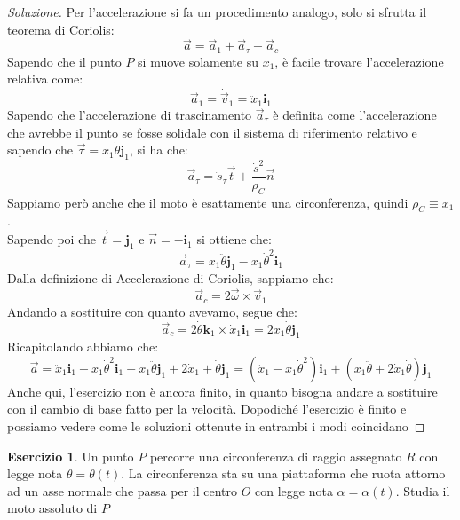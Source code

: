 \documentclass[11pt,a4paper,twoside]{article}
\theoremstyle{definition}
\newtheorem{ese}{Esercizio}[section]
\newenvironment{sol}
	{\renewcommand\qedsymbol{$\blacksquare$}\begin{proof}[Soluzione]}
	{\end{proof}}
\begin{document}
\begin{sol}
	Per l'accelerazione si fa un procedimento analogo, solo si sfrutta il teorema di Coriolis:
	\[\vec a = \vec a_1 + \vec a_\tau + \vec a_c\]
	Sapendo che il punto $P$ si muove solamente su $x_1$, è facile trovare l'accelerazione relativa come:
	\[ \vec a_1 = \dot{\vec v}_1 = \ddot x_1 \mathbf i_1 \]
	Sapendo che l'accelerazione di trascinamento $\vec a_\tau$ è definita come l'accelerazione che avrebbe il punto se fosse solidale con il sistema di riferimento relativo e sapendo che $\vec \tau = x_1 \dot \theta \mathbf j_1$, si ha che:
	\[ \vec a_\tau = \ddot s_\tau \vec t + \frac{\dot s^2}{\rho_C} \vec n \]
	Sappiamo però anche che il moto è esattamente una circonferenza, quindi $\rho_C\equiv x_1$.\\
	Sapendo poi che $ \vec t = \mathbf j_1$ e $\vec n = -\mathbf i_1$ si ottiene che:
	\[ \vec a_\tau = x_1 \ddot \theta \mathbf j_1 - x_1 \dot \theta^2 \mathbf i_1 \]
	Dalla definizione di Accelerazione di Coriolis, sappiamo che:
	\[ \vec a_c = 2 \vec \omega \times \vec v_1 \]
	Andando a sostituire con quanto avevamo, segue che:
	\[ \vec a_c = 2 \dot \theta \mathbf k_1 \times \dot x_1 \mathbf i_1 = 2 x_1 \dot \theta \mathbf j_1\]
	Ricapitolando abbiamo che:
	\[ \vec a = \ddot x_1 \mathbf i_1 - x_1 \dot \theta^2 \mathbf i_1 + x_1 \ddot \theta \mathbf j_1 + 2 \dot x_1 + \dot \theta \mathbf j_1 = (\ddot x_1 - x_1 \dot \theta^2)\mathbf i_1 + (x_1 \ddot \theta + 2 \dot x_1 \dot \theta) \mathbf j_1\]
	Anche qui, l'esercizio non è ancora finito, in quanto bisogna andare a sostituire con il cambio di base fatto per la velocità. Dopodiché l'esercizio è finito e possiamo vedere come le soluzioni ottenute in entrambi i modi coincidano
\end{sol}

\begin{ese}
	Un punto $P$ percorre una circonferenza di raggio assegnato $R$ con legge nota $\theta = \theta(t)$. La circonferenza sta su una piattaforma che ruota attorno ad un asse normale che passa per il centro $O$ con legge nota $\alpha = \alpha(t)$.
	Studia il moto assoluto di $P$
\end{ese}
\end{document}
